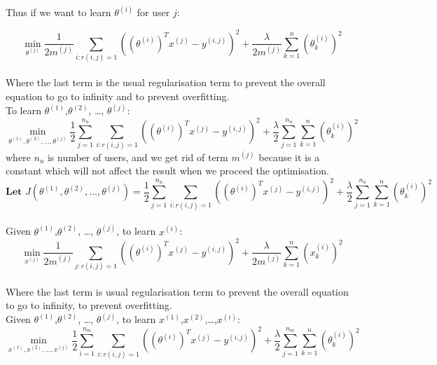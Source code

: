 Thus if we want to learn $\theta^{(i)}$ for user $j$:

\begin{equation*}
\min_{\theta^{(j)}} \frac{1}{2m^{(j)}}\sum_{i:r(i,j) = 1}\left((\theta^{(i)})^{T}x^{(j)}-y^{(i,j)}\right)^{2} + \frac{\lambda}{2m^{(j)}}\sum_{k = 1}^{n}(\theta^{(i)}_{k})^{2}
\end{equation*}
\\Where the last term is the usual regularisation term to prevent the overall equation to go to infinity and to prevent overfitting.
\\ To learn $\theta^{(1)}$,$\theta^{(2)}$, \dots, $\theta^{(j)}$:
\begin{equation*}
\min_{\theta^{(1)},\theta^{(2)}, \dots, \theta^{(j)}} \frac{1}{2}\sum_{j = 1}^{n_{u}}\sum_{i:r(i,j) = 1}\left((\theta^{(i)})^{T}x^{(j)}-y^{(i,j)}\right)^{2} + \frac{\lambda}{2}\sum_{j = 1}^{n_{u}}\sum_{k = 1}^{n}(\theta^{(i)}_{k})^{2}
\end{equation*}
where $n_{u}$ is number of users, and we get rid of term $m^{(j)}$ because it is a constant which will not affect the result when we proceed the optimisation.
\begin{equation*}
\textbf{Let     } J(\theta^{(1)},\theta^{(2)}, \dots, \theta^{(j)}) = \frac{1}{2}\sum_{j = 1}^{n_{u}}\sum_{i:r(i,j) = 1}\left((\theta^{(i)})^{T}x^{(j)}-y^{(i,j)}\right)^{2} + \frac{\lambda}{2}\sum_{j = 1}^{n_{u}}\sum_{k = 1}^{n}(\theta^{(i)}_{k})^{2}
\end{equation*}
\\Given $\theta^{(1)}$,$\theta^{(2)}$, \dots, $\theta^{(j)}$, to learn $x^{(i)}$:
\begin{equation*}
\min_{x^{(j)}} \frac{1}{2m^{(j)}}\sum_{j:r(i,j) = 1}\left((\theta^{(i)})^{T}x^{(j)}-y^{(i,j)}\right)^{2} + \frac{\lambda}{2m^{(j)}}\sum_{k = 1}^{n}(x^{(i)}_{k})^{2}
\end{equation*}
\\Where the last term is usual regularisation term to prevent the overall equation to go to infinity, to prevent overfitting.
\\Given $\theta^{(1)}$,$\theta^{(2)}$, \dots, $\theta^{(j)}$, to learn $x^{(1)}$,$x^{(2)}$,\dots,$x^{(i)}$:
\begin{equation*}
\min_{x^{(1)},x^{(2)}, \dots,x^{(j)}} \frac{1}{2}\sum_{i = 1}^{n_{m}}\sum_{i:r(i,j) = 1}\left((\theta^{(i)})^{T}x^{(j)}-y^{(i,j)}\right)^{2} + \frac{\lambda}{2}\sum_{j = 1}^{n_{m}}\sum_{k = 1}^{n}(\theta^{(i)}_{k})^{2}
\end{equation*}
